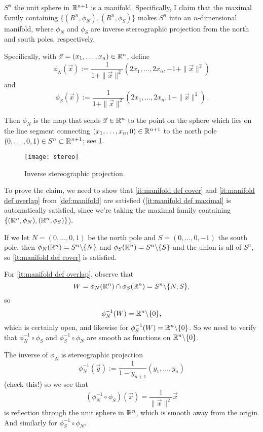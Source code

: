 \begin{example}
	$S^n$ the unit sphere in $\mathbb{R}^{n+1}$ is a manifold. Specifically, I claim that the maximal family containing $\{(R^n, \phi_N), (R^n, \phi_S)\}$ makes $S^n$ into an $n$-dimensional manifold, where $\phi_N$ and $\phi_S$ are inverse stereographic projection from the north and south poles, respectively. 
	
	Specifically, with $\vec{x} = (x_1, \dots , x_n) \in \mathbb{R}^n$, define
	\[
		\phi_N(\vec{x}) := \frac{1}{1+\|\vec{x}\|^2}\left(2x_1, \dots , 2x_n, -1+\|\vec{x}\|^2\right)
	\]
	and
	\[
		\phi_S(\vec{x}) := \frac{1}{1+\|\vec{x}\|^2}\left(2x_1, \dots , 2x_n, 1-\|\vec{x}\|^2\right).
	\]
	
	Then $\phi_N$ is the map that sends $\vec{x} \in \mathbb{R}^n$ to the point on the sphere which lies on the line segment connecting $(x_1,\dots , x_n, 0) \in \mathbb{R}^{n+1}$ to the north pole $(0, \dots , 0, 1) \in S^n \subset \mathbb{R}^{n+1}$; see \cref{fig:stereo}. 
	
	\begin{figure}[htbp]
		\centering
			\texttt{[image: stereo]}
		\caption{Inverse stereographic projection.}
		\label{fig:stereo}
	\end{figure}

To prove the claim, we need to show that \ref{it:manifold def cover} and \ref{it:manifold def overlap} from \cref{def:manifold} are satisfied (\ref{it:manifold def maximal} is automatically satisfied, since we're taking the maximal family containing $\{(\mathbb{R}^n, \phi_N), (\mathbb{R}^n, \phi_S)\}$). 

If we let $N = (0,\dots , 0, 1)$ be the north pole and $S = (0,\dots , 0, -1)$ the south pole, then $\phi_N(\mathbb{R}^n) = S^n \backslash\{N\}$ and $\phi_S(\mathbb{R}^n) = S^n \backslash\{S\}$ and the union is all of $S^n$, so \ref{it:manifold def cover} is satisfied.

For \ref{it:manifold def overlap}, observe that
\[
	W = \phi_N(\mathbb{R}^n) \cap \phi_S(\mathbb{R}^n) = S^n \backslash\{N,S\},
\]
so 
\[
	\phi_N^{-1}(W) = \mathbb{R}^n \backslash\{0\},
\]
which is certainly open, and likewise for $\phi_S^{-1}(W) = \mathbb{R}^n \backslash\{0\}$. So we need to verify that $\phi_N^{-1} \circ \phi_S$ and $\phi_S^{-1} \circ \phi_N$ are smooth as functions on $\mathbb{R}^n \backslash\{0\}$.

The inverse of $\phi_N$ is stereographic projection 
\[
	\phi_N^{-1}(\vec{y}) := \frac{1}{1-y_{n+1}} (y_1, \dots , y_n)
\]
(check this!) so we see that
\[
	(\phi_N^{-1} \circ \phi_S)(\vec{x}) = \frac{1}{\|\vec{x}\|^2}\vec{x}
\]
is reflection through the unit sphere in $\mathbb{R}^n$, which is smooth away from the origin. And similarly for $\phi_S^{-1} \circ \phi_N$.
\end{example}

